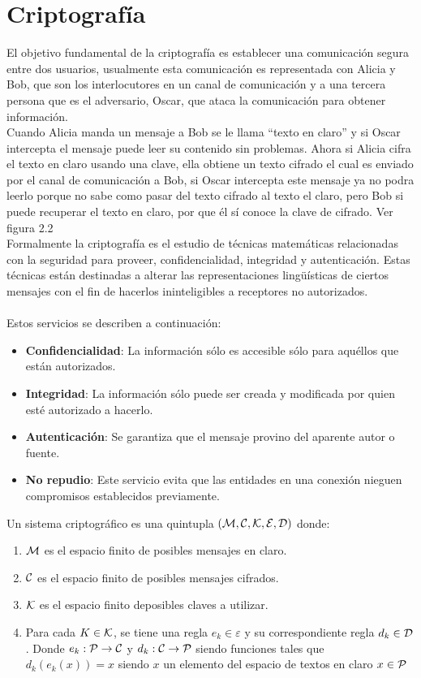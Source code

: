 \documentclass[12pt,oneside,onecolumn,openany]{report}
\begin{document}
\section{Criptografía}


El objetivo fundamental de la criptografía es establecer una comunicación segura entre dos usuarios, usualmente esta comunicación es representada con Alicia y Bob, que son los interlocutores en un canal de comunicación y a una tercera persona que es el adversario, Oscar, que ataca la comunicación para obtener información. \\
Cuando Alicia manda un mensaje a Bob se le llama “texto en claro” y si Oscar intercepta el mensaje puede leer su contenido sin problemas. Ahora si Alicia cifra el texto en claro usando una clave, ella obtiene un texto cifrado el cual es enviado por el canal de comunicación a Bob, si Oscar intercepta este mensaje ya no podra leerlo porque no sabe como pasar del texto cifrado al texto el claro, pero Bob si puede recuperar el texto en claro, por que él sí conoce la clave de cifrado.\cite{stin} Ver figura 2.2\\

Formalmente la criptografía es el estudio de técnicas matemáticas relacionadas con la seguridad para proveer, confidencialidad, integridad y autenticación. Estas técnicas están destinadas a alterar las representaciones lingüísticas de ciertos mensajes con el fin de hacerlos ininteligibles a receptores no autorizados.\cite{cri}\\\\
Estos servicios se describen a continuación:
\begin{itemize}
 \item \textbf{Confidencialidad}:  La  información  sólo es  accesible  sólo  para  aquéllos  que  están autorizados.
 \item \textbf{Integridad}:  La información sólo puede ser creada y modificada por quien esté autorizado a hacerlo.
 \item \textbf{Autenticación}: Se garantiza que el mensaje provino del aparente autor o fuente.
 \item \textbf{No repudio}:  Este servicio evita que las entidades en una conexión nieguen compromisos establecidos previamente.
\end{itemize}

Un sistema criptográfico es una quintupla $(\cal M,C,K,E,D)$ donde:

\begin{enumerate}
 \item $\cal M$ es el espacio finito de posibles mensajes en claro.
 \item $\cal C$ es el espacio finito de posibles mensajes cifrados.
 \item $\cal K$ es el espacio finito deposibles claves a utilizar.
 \item Para cada $K \in \cal K$, se tiene una regla $e_k\in \varepsilon$ y su correspondiente regla $d_k\in \cal D$. Donde $e_k :\cal P\rightarrow C$ y $d_k:\cal C\rightarrow P$ siendo funciones tales que $d_k(e_k(x))=x$ siendo $x$ un elemento del espacio de textos en claro $x\in\cal P$
\end{enumerate}
\end{document}
